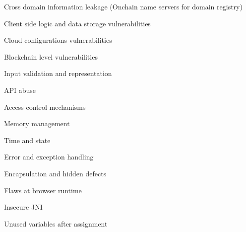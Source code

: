 \documentclass[11pt]{article}
\begin{document}
Cross domain information leakage (Onchain name servers for domain registry)


Client side logic and data storage vulnerabilities


Cloud configurations vulnerabilities


Blockchain level vulnerabilities


Input validation and representation


API abuse


Access control mechanisms


Memory management


Time and state


Error and exception handling


Encapsulation and hidden defects


Flaws at browser runtime


Insecure JNI


Unused variables after assignment
\end{document}
